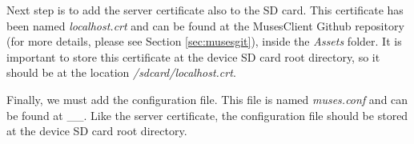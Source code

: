 \documentclass[a4paper,11pt]{book}
\begin{document}
Next step is to add the server certificate also to the SD card. This certificate has been named \textit{localhost.crt} and can be found at the MusesClient Github repository (for more details, please see Section \ref{sec:musesgit}), inside the \textit{Assets} folder. It is important to store this certificate at the device SD card root directory, so it should be at the location \textit{/sdcard/localhost.crt}.

Finally, we must add the configuration file. This file is named \textit{muses.conf} and can be found at \_\_. Like the server certificate, the configuration file should be stored at the device SD card root directory.



\end{document}
